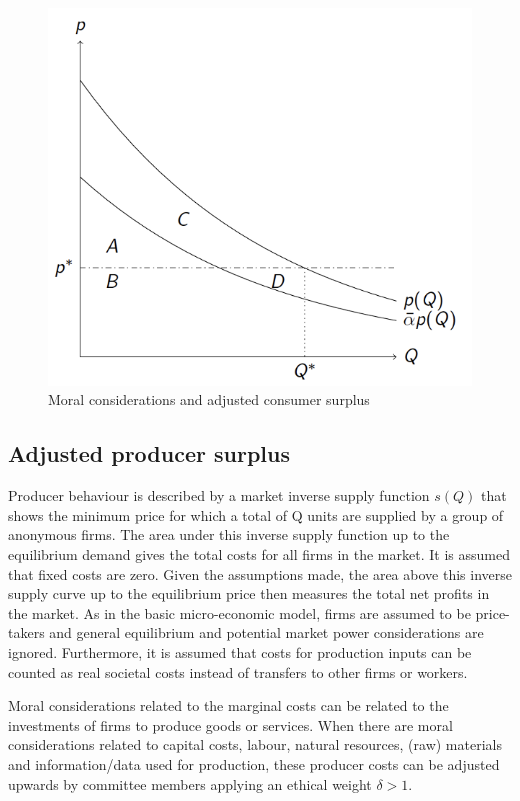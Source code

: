 \documentclass[
]{book}
\begin{document}
\begin{figure}
\includegraphics[width=8.17in]{./figures/moralconsiderations} \caption{Moral considerations and adjusted consumer surplus}\label{fig:moralconsiderations}
\end{figure}

\hypertarget{adjusted-producer-surplus}{%
\subsection{Adjusted producer surplus}\label{adjusted-producer-surplus}}

Producer behaviour is described by a market inverse supply function \(s(Q)\) that shows the minimum price for which a total of Q units are supplied by a group of anonymous firms. The area under this inverse supply function up to the equilibrium demand gives the total costs for all firms in the market. It is assumed that fixed costs are zero. Given the assumptions made, the area above this inverse supply curve up to the equilibrium price then measures the total net profits in the market. As in the basic micro-economic model, firms are assumed to be price-takers and general equilibrium and potential market power considerations are ignored. Furthermore, it is assumed that costs for production inputs can be counted as real societal costs instead of transfers to other firms or workers.

Moral considerations related to the marginal costs can be related to the investments of firms to produce goods or services. When there are moral considerations related to capital costs, labour, natural resources, (raw) materials and information/data used for production, these producer costs can be adjusted upwards by committee members applying an ethical weight \(\delta > 1\).
\end{document}
